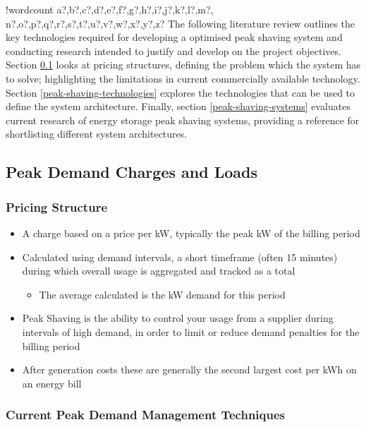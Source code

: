 \documentclass[10pt]{article}
\providecommand{\tightlist}{%
  \setlength{\itemsep}{0pt}\setlength{\parskip}{0pt}}
\newcounter{words}
\newenvironment{counted}{%
  \setcounter{words}{0}
  \SearchList!{wordcount}{\stepcounter{words}}
    {a?,b?,c?,d?,e?,f?,g?,h?,i?,j?,k?,l?,m?,
    n?,o?,p?,q?,r?,s?,t?,u?,v?,w?,x?,y?,z?}
  \UndoBoundary{'}
  \SearchOrder{p;}}{%
  \StopSearching}
\begin{document}
\begin{counted}
The following literature review outlines the key technologies required
for developing a optimised peak shaving system and conducting research
intended to justify and develop on the project objectives. Section
\ref{peak-demand-charges-and-loads} looks at pricing structures,
defining the problem which the system has to solve; highlighting the
limitations in current commercially available technology. Section
\ref{peak-shaving-technologies} explores the technologies that can be
used to define the system architecture. Finally, section
\ref{peak-shaving-systems} evaluates current research of energy storage
peak shaving systems, providing a reference for shortlisting different
system architectures.

\subsection{Peak Demand Charges and
Loads}\label{peak-demand-charges-and-loads}

\subsubsection{Pricing Structure}\label{pricing-structure}

\begin{itemize}
\tightlist
\item
  A charge based on a price per kW, typically the peak kW of the billing
  period\cite{schneiderRECPS}
\item
  Calculated using demand intervals, a short timeframe (often 15
  minutes) during which overall usage is aggregated and tracked as a
  total

  \begin{itemize}
  \tightlist
  \item
    The average calculated is the kW demand for this period
  \end{itemize}
\item
  Peak Shaving is the ability to control your usage from a supplier
  during intervals of high demand, in order to limit or reduce demand
  penalties for the billing period
\item
  After generation costs these are generally the second largest cost per
  kWh on an energy bill
\end{itemize}

\subsubsection{Current Peak Demand Management
Techniques}\label{current-peak-demand-management-techniques}


\end{counted}
\end{document}
